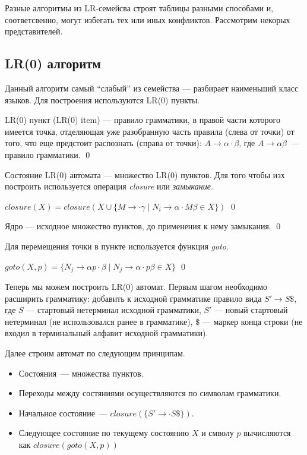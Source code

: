 Разные алгоритмы из LR-семейсва строят таблицы разными способами и, соответсвенно, могут избегать тех или иных конфликтов. Рассмотрим некорых представителей.

\subsection{LR(0) алгоритм}

Данный алгоритм самый ``слабый'' из семейства --- разбирает наименьший класс языков.
Для построения используются LR(0) пункты.

\begin{definition}
LR(0) пункт (LR(0) item) --- правило грамматики, в правой части которого имеется точка, отделяющая уже разобранную часть правила (слева от точки) от того, что еще предстоит распознать (справа от точки): $A \to \alpha \cdot \beta$, где $A \to \alpha \beta$~--- правило грамматики.
\qed
\end{definition}

Состояние LR(0) автомата --- множество LR(0) пунктов. Для того чтобы изх построить используется операция \textit{closure} или \textit{замыкание}.

\begin{definition}
$closure(X)  = closure(X \cup \{M \rightarrow \cdot \gamma \mid N_i \rightarrow \alpha\cdot M\beta \in X \})$
\qed
\end{definition}

\begin{definition}
Ядро --- исходное множество пунктов, до применения к нему замыкания.
\qed
\end{definition}

Для перемещения точки в пункте используется функция \textit{goto}.

\begin{definition}
$goto(X,p)  = \{N_j \rightarrow \alpha p \cdot \beta \mid N_j \rightarrow \alpha\cdot p\beta \in X \}$
\qed
\end{definition}

Теперь мы можем построить LR(0) автомат.
Первым шагом необходимо расширить грамматику: добавить к исходной грамматике правило вида $S' \to S \$$, где $S$ --- стартовый нетерминал исходной грамматики, $S'$ --- новый стартовый нетерминал (не использовался ранее в грамматике), $\$$ --- маркер конца строки (не входил в терминальный алфавит исходной грамматики).

Далее строим автомат по следующим принципам.

\begin{itemize}
    \item Состояния~--- множества пунктов.
    \item Переходы между состяниями осуществляются по символам грамматики.
    \item Начальное состояние~--- $closure(\{S'\to
    \cdot S \$\})$.
    \item Следующее состояние по текущему состоянию $X$ и смволу $p$ вычисляются как $closure(goto(X, p))$
  \end{itemize}

